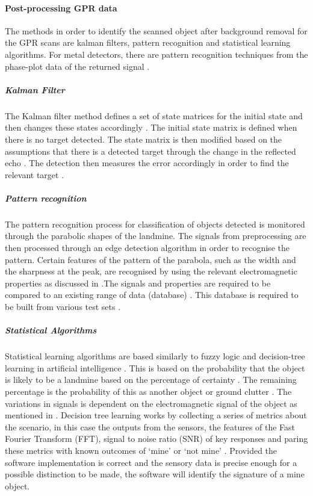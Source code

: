 \documentclass[main.tex]{subfiles}
\begin{document}
{\paragraph{Post-processing GPR data}
The methods in order to identify the scanned object after background removal for the GPR scans are kalman filters, pattern recognition and statistical learning algorithms. For metal detectors, there are pattern recognition techniques from the phase-plot data of the returned signal \parencite{long2006image}.
\subparagraph{Kalman Filter} The Kalman filter method defines a set of state matrices for the initial state and then changes these states accordingly \parencite{torrione2006ground}. The initial state matrix is defined when there is no target detected. The state matrix is then modified based on the assumptions that there is a detected target through the change in the reflected echo \parencite{torrione2006ground}. The detection then measures the error accordingly in order to find the relevant target \parencite{torrione2006ground}. 
\subparagraph{Pattern recognition} \parencite{pasolli2009automatic}
The pattern recognition process for classification of objects detected is monitored through the parabolic shapes of the landmine\parencite{pasolli2009automatic}. The signals from preprocessing are then processed through an edge detection algorithm in order to recognise the pattern\parencite{long2006image}. Certain features of the pattern of the parabola, such as the width and the sharpness at the peak, are recognised by using the relevant electromagnetic properties as discussed in \parencite{long2006image}.The signals and properties are required to be compared to an existing range of data (database) \parencite{ko2012gpr}. This database is required to be built from various test sets \parencite{ko2012gpr}.\\
\subparagraph{Statistical Algorithms} Statistical learning algorithms are based similarly to fuzzy logic and decision-tree learning in artificial intelligence \parencite{sakaguchi2014physics}. This is based on the probability that the object is likely to be a landmine based on the percentage of certainty \parencite{sakaguchi2014physics}. The remaining percentage is the probability of this as another object or ground clutter \parencite{sakaguchi2014physics}. The variations in signals is dependent on the electromagnetic signal of the object as mentioned in . Decision tree learning works by collecting a series of metrics about the scenario, in this case the outputs from the sensors, the features of the Fast Fourier Transform (FFT), signal to noise ratio (SNR) of key responses and paring these metrics with known outcomes of ‘mine’ or ‘not mine’ \parencite{sakaguchi2014physics}. Provided the software implementation is correct and the sensory data is precise enough for a possible distinction to be made, the software will identify the signature of a mine object. 
% 
% 
}
\end{document}
